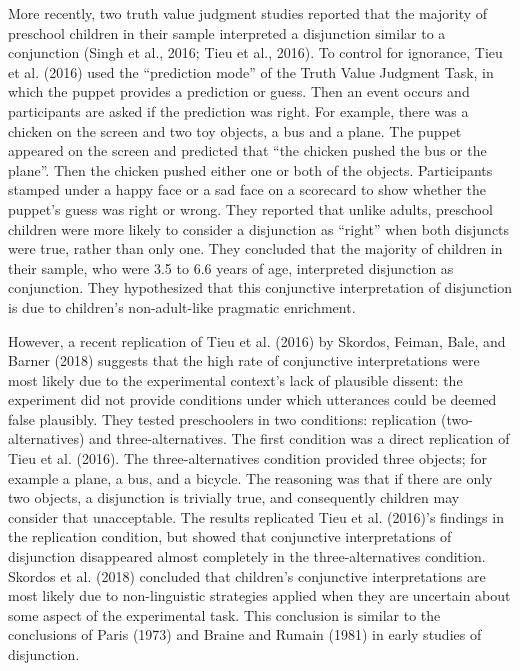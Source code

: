 \documentclass[,man,floatsintext]{apa6}
\begin{document}
More recently, two truth value judgment studies reported that the majority of preschool children in their sample interpreted a disjunction similar to a conjunction (Singh et al., 2016; Tieu et al., 2016). To control for ignorance, Tieu et al. (2016) used the \enquote{prediction mode} of the Truth Value Judgment Task, in which the puppet provides a prediction or guess. Then an event occurs and participants are asked if the prediction was right. For example, there was a chicken on the screen and two toy objects, a bus and a plane. The puppet appeared on the screen and predicted that \enquote{the chicken pushed the bus or the plane}. Then the chicken pushed either one or both of the objects. Participants stamped under a happy face or a sad face on a scorecard to show whether the puppet's guess was right or wrong. They reported that unlike adults, preschool children were more likely to consider a disjunction as \enquote{right} when both disjuncts were true, rather than only one. They concluded that the majority of children in their sample, who were 3.5 to 6.6 years of age, interpreted disjunction as conjunction. They hypothesized that this conjunctive interpretation of disjunction is due to children's non-adult-like pragmatic enrichment.

However, a recent replication of Tieu et al. (2016) by Skordos, Feiman, Bale, and Barner (2018) suggests that the high rate of conjunctive interpretations were most likely due to the experimental context's lack of plausible dissent: the experiment did not provide conditions under which utterances could be deemed false plausibly. They tested preschoolers in two conditions: replication (two-alternatives) and three-alternatives. The first condition was a direct replication of Tieu et al. (2016). The three-alternatives condition provided three objects; for example a plane, a bus, and a bicycle. The reasoning was that if there are only two objects, a disjunction is trivially true, and consequently children may consider that unacceptable. The results replicated Tieu et al. (2016)'s findings in the replication condition, but showed that conjunctive interpretations of disjunction disappeared almost completely in the three-alternatives condition. Skordos et al. (2018) concluded that children's conjunctive interpretations are most likely due to non-linguistic strategies applied when they are uncertain about some aspect of the experimental task. This conclusion is similar to the conclusions of Paris (1973) and Braine and Rumain (1981) in early studies of disjunction.
\end{document}
